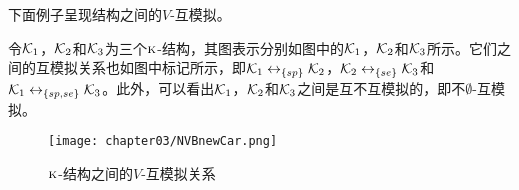 %


下面例子呈现结构之间的$V$-互模拟。
\begin{example}\label{exam:vB}
	令${\cal K}_1$，${\cal K}_2$和${\cal K}_3$为三个$\textsc{k}$-结构，其图表示分别如图中的${\cal K}_1$，${\cal K}_2$和${\cal K}_3$所示。它们之间的互模拟关系也如图中标记所示，即${\cal K}_1 \leftrightarrow_{\{sp\}} {\cal K}_2$，${\cal K}_2 \leftrightarrow_{\{se\}} {\cal K}_3$和${\cal K}_1 \leftrightarrow_{\{sp,se\}} {\cal K}_3$。此外，可以看出${\cal K}_1$，${\cal K}_2$和${\cal K}_3$之间是互不互模拟\cite{Baier:PMC:2008}的，即不$\emptyset$-互模拟。
	\begin{figure*}[!htb]
		\centering
		\texttt{[image: chapter03/NVBnewCar.png]}\\
		\caption{$\textsc{k}$-结构之间的$V$-互模拟关系}
		\label{Fig:chapter04:v1uv2}
	\end{figure*}
\end{example}

 
 
